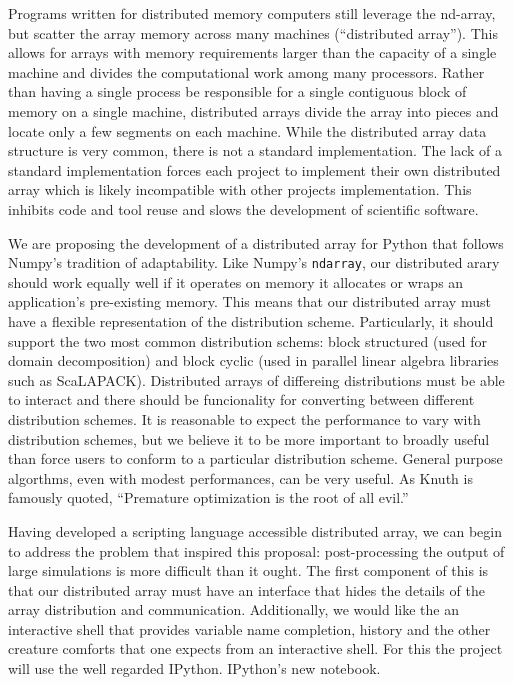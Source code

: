 \documentclass[a4paper]{article}
\begin{document}
Programs written for distributed memory computers still leverage the nd-array, but scatter the array memory across many machines (``distributed array'').  This allows for arrays with memory requirements larger than the capacity of a single machine and divides the computational work among many processors.  Rather than having a single process be responsible for a single contiguous block of memory on a single machine, distributed arrays divide the array into pieces and locate only a few segments on each machine.  While the distributed array data structure is very common, there is not a standard implementation.  The lack of a standard implementation forces each project to implement their own distributed array which is likely incompatible with other projects implementation.  This inhibits code and tool reuse and slows the development of scientific software.

We are proposing the development of a distributed array for Python that follows Numpy's tradition of adaptability.  Like Numpy's \texttt{ndarray}, our distributed arary should work equally well if it operates on memory it allocates or wraps an application's pre-existing memory.  This means that our distributed array must have a flexible representation of the distribution scheme.  Particularly, it should support the two most common distribution schems: block structured (used for domain decomposition) and block cyclic (used in parallel linear algebra libraries such as ScaLAPACK\cite{scalapack}).  Distributed arrays of differeing distributions must be able to interact and there should be funcionality for converting between different distribution schemes.  It is reasonable to expect the performance to vary with distribution schemes, but we believe it to be more important to broadly useful than force users to conform to a particular distribution scheme.  General purpose algorthms, even with modest performances, can be very useful.  As Knuth is famously quoted, ``Premature optimization is the root of all evil.''\cite{Knuth1974}

Having developed a scripting language accessible distributed array, we can begin to address the problem that inspired this proposal: post-processing the output of large simulations is more difficult than it ought.  The first component of this is that our distributed array must have an interface that hides the details of the array distribution and communication.  Additionally, we would like the an interactive shell that provides variable name completion, history and the other creature comforts that one expects from an interactive shell.  For this the project will use the well regarded IPython.  IPython's new notebook\cite{ipython-notebook}.
\end{document}

